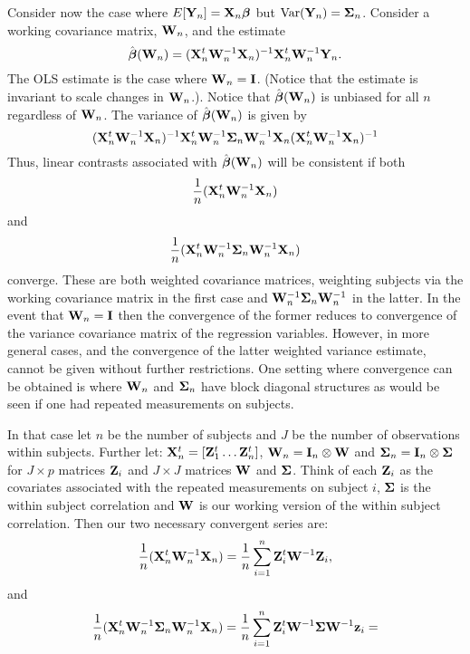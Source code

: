 Consider now the case where $E[\mathbf{Y}_n] = \mathbf{X}_n\boldsymbol{\beta}$ but $\mbox{Var}(\mathbf{Y}_n) = \boldsymbol{\Sigma}_n$. Consider
a working covariance matrix, $\mathbf{W}_n$, and the estimate
$$
\hat {\boldsymbol{\beta}}(\mathbf{W}_n) = (\mathbf{X}^t_n \mathbf{W}^{-1}_n \mathbf{X}_n)^{-1} \mathbf{X}^t_n \mathbf{W}^{-1}_n \mathbf{Y}_n.
$$
The OLS estimate is the case where $\mathbf{W}_n = \mathbf{I}$. (Notice that the estimate is invariant to scale
changes in $\mathbf{W}_n$.). Notice that $\hat {\boldsymbol{\beta}}(\mathbf{W}_n)$ is unbiased for all $n$ regardless of $\mathbf{W}_n$.
The variance of $\hat {\boldsymbol{\beta}}(\mathbf{W}_n)$ is given by
$$
(\mathbf{X}^t_n \mathbf{W}^{-1}_n \mathbf{X}_n)^{-1} \mathbf{X}^t_n \mathbf{W}^{-1}_n \boldsymbol{\Sigma}_n  \mathbf{W}^{-1}_n \mathbf{X}_n (\mathbf{X}^t_n \mathbf{W}^{-1}_n \mathbf{X}_n)^{-1}
$$
Thus, linear contrasts associated with $\hat {\boldsymbol{\beta}}(\mathbf{W}_n)$ will be consistent if both
$$
\frac{1}{n}(\mathbf{X}^t_n \mathbf{W}^{-1}_n \mathbf{X}_n)
$$
and
$$
\frac{1}{n}(\mathbf{X}^t_n \mathbf{W}^{-1}_n \boldsymbol{\Sigma}_n  \mathbf{W}^{-1}_n \mathbf{X}_n)
$$
converge. These are both weighted covariance matrices, weighting subjects via 
the working covariance matrix in the first case and $\mathbf{W}^{-1}_n \boldsymbol{\Sigma}_n  \mathbf{W}^{-1}_n$ in the
latter. In the event that $\mathbf{W}_n = \mathbf{I}$ then the convergence of the former reduces to
convergence of the variance covariance matrix of the regression variables. However,
in more general cases, and the convergence of the latter weighted variance estimate,
cannot be given without further restrictions. 
One setting where convergence can be obtained is where $\mathbf{W}_n$ and
$\boldsymbol{\Sigma}_n$ have block diagonal structures as would be seen if one had repeated measurements
on subjects. 

In that case let $n$ be the number of subjects and $J$ be the number of observations within
subjects. Further let:
$\mathbf{X}_n^t = [\mathbf{Z}_1^t \ldots \mathbf{Z}_n^t]$, $\mathbf{W}_n = \mathbf{I}_{n} \otimes \mathbf{W}$ and $\boldsymbol{\Sigma}_n = \mathbf{I}_{n} \otimes \boldsymbol{\Sigma}$ for 
$J \times p$ matrices $\mathbf{Z}_i$ and $J\times J$
matrices $\mathbf{W}$ and $\boldsymbol{\Sigma}$. Think of each $\mathbf{Z}_i$ as the covariates associated with the 
repeated measurements on subject $i$, $\boldsymbol{\Sigma}$ is the within subject correlation and
$\mathbf{W}$ is our working version of the within subject correlation. Then our two necessary convergent series are:
$$
\frac{1}{n}(\mathbf{X}^t_n \mathbf{W}^{-1}_n \mathbf{X}_n) = \frac{1}{n} \sum_{i=1}^n \mathbf{Z}_i^t \mathbf{W}^{-1} \mathbf{Z}_i
,
$$
and
$$
\frac{1}{n}(\mathbf{X}^t_n \mathbf{W}^{-1}_n \boldsymbol{\Sigma}_n  \mathbf{W}^{-1}_n \mathbf{X}_n)=
\frac{1}{n} \sum_{i=1}^n \mathbf{Z}_i^t \mathbf{W}^{-1}\boldsymbol{\Sigma}\mathbf{W}^{-1} \mathbf{z}_i = 
$$


